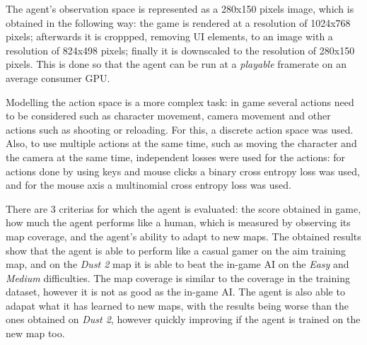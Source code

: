 The agent's observation space is represented as a 280x150 pixels image, which is obtained in the following way: the game is rendered at a resolution of 1024x768 pixels; afterwards it is croppped, removing UI elements, to an image with a resolution of 824x498 pixels; finally it is downscaled to the resolution of 280x150 pixels. This is done so that the agent can be run at a \emph{playable} framerate on an average consumer GPU.

Modelling the action space is a more complex task: in game several actions need to be considered such as character movement, camera movement and other actions such as shooting or reloading. For this, a discrete action space was used. Also, to use multiple actions at the same time, such as moving the character and the camera at the same time, independent losses were used for the actions: for actions done by using keys and mouse clicks a binary cross entropy loss was used, and for the mouse axis a multinomial cross entropy loss was used.

There are 3 criterias for which the agent is evaluated: the score obtained in game, how much the agent performs like a human, which is measured by observing its map coverage, and the agent's ability to adapt to new maps. The obtained results show that the agent is able to perform like a casual gamer on the aim training map, and on the \emph{Dust 2} map it is able to beat the in-game AI on the \emph{Easy} and \emph{Medium} difficulties. The map coverage is similar to the coverage in the training dataset, however it is not as good as the in-game AI. The agent is also able to adapat what it has learned to new maps, with the results being worse than the ones obtained on \emph{Dust 2}, however quickly improving if the agent is trained on the new map too.
